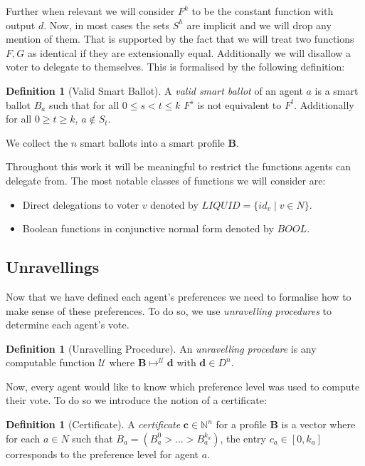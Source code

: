 \documentclass[11pt,a4paper, titlepage]{article}
\theoremstyle{definition}
\newtheorem{definition}[theorem]{Definition}
\let\vec\mathbf
\begin{document}
Further when relevant we will consider $F^{k}$ to be the constant function with output $d$. Now, in most cases the sets $S^h$ are implicit and we will drop any mention of them. That is supported by the fact that we will treat two functions $F, G$ as identical if they are extensionally equal. Additionally we will disallow a voter to delegate to themselves. This is formalised by the following definition:

\begin{definition}[Valid Smart Ballot]
    A \emph{valid smart ballot} of an agent $a$ is a smart ballot $B_a$ such that for all $ 0 \leq s < t \leq k$ $F^s$ is not equivalent to $F^t$. Additionally for all $0 \geq t \geq k$, $a \notin S_t$.
\end{definition}


We collect the $n$ smart ballots into a smart profile $\mathbf{B}$.

Throughout this work it will be meaningful to restrict the functions agents can delegate from. The most notable classes of functions we will consider are: 

\begin{itemize}
    \item Direct delegations to voter $v$ denoted by $\mathit{LIQUID} = \{\mathit{id}_v \mid v \in N\}$.
    \item Boolean functions in conjunctive normal form denoted by $\mathit{BOOL}$. 
\end{itemize}

\subsection{Unravellings}

Now that we have defined each agent's preferences we need to formalise how to make sense of these preferences. To do so, we use \emph{unravelling procedures} to determine each agent's vote.

\begin{definition}[Unravelling Procedure]
    An \emph{unravelling procedure} is any computable function $\mathcal{U}$ where $\mathbf{B} \mapsto^\mathcal{U} \vec{d}$ with $\vec{d} \in D^n$.
\end{definition}

Now, every agent would like to know which preference level was used to compute their vote. To do so we introduce the notion of a certificate:

\begin{definition}[Certificate]
    A \emph{certificate} $\mathbf{c} \in \mathbb{N}^n$ for a profile $\mathbf{B}$ is a vector where for each $a \in N$ such that $B_a = (B_a^0 > \ldots > B_a^{k_a})$, the entry $c_a \in [0, k_a]$ corresponds to the preference level for agent $a$.  
\end{definition}
\end{document}
